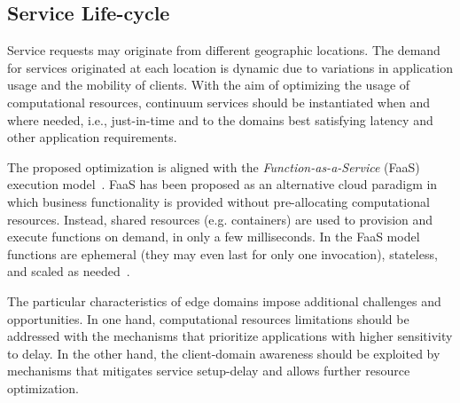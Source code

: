 


\subsection{Service Life-cycle}

Service requests may originate from different geographic locations. The demand for services originated at each location is dynamic due to variations in application usage and the mobility of clients. With the aim of optimizing the usage of computational resources, continuum services should be instantiated when and where needed, i.e., just-in-time and to the domains best satisfying latency and other application requirements.   

The proposed optimization is aligned with the \textit{Function-as-a-Service} (FaaS) execution model~\cite{MateosFaaster17}. FaaS has been proposed as an alternative cloud paradigm in which business functionality is provided without pre-allocating computational resources. Instead, shared resources (e.g. containers) are used to provision and execute functions on demand, in only a few milliseconds. In the FaaS model functions are ephemeral (they may even last for only one invocation), stateless, and scaled as needed~\cite{Roberts:2016}. 


The particular characteristics of edge domains impose additional challenges and opportunities. In one hand, computational resources limitations should be addressed with the mechanisms that prioritize applications with higher sensitivity to delay. In the other hand, the client-domain awareness should be exploited by mechanisms that mitigates service setup-delay and allows further resource optimization.


